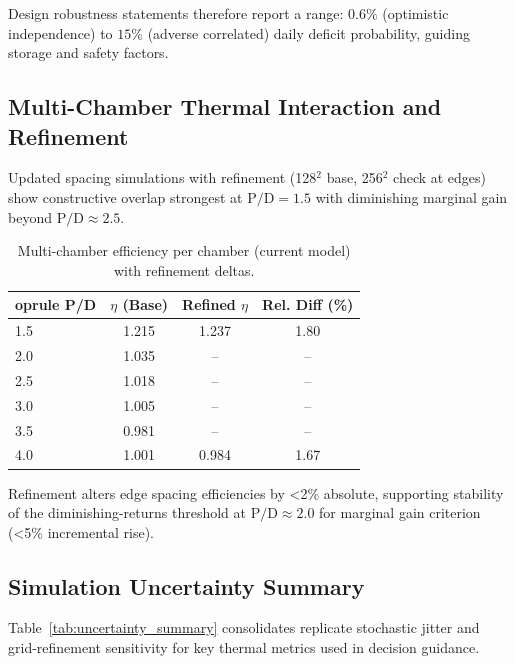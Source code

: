 Design robustness statements therefore report a range: $0.6\%$ (optimistic independence) to $15\%$ (adverse correlated) daily deficit probability, guiding storage and safety factors.

\subsection{Multi-Chamber Thermal Interaction and Refinement}

Updated spacing simulations with refinement (128$^2$ base, 256$^2$ check at edges) show constructive overlap strongest at $\mathrm{P/D}=1.5$ with diminishing marginal gain beyond $\mathrm{P/D}\approx2.5$.

\begin{table}[H]
\centering
\caption{Multi-chamber efficiency per chamber (current model) with refinement deltas.}
\begin{tabular}{@{}lccc@{}}
	oprule
P/D & $\eta$ (Base) & Refined $\eta$ & Rel. Diff (\%) \\
\midrule
1.5 & 1.215 & 1.237 & 1.80 \\
2.0 & 1.035 & -- & -- \\
2.5 & 1.018 & -- & -- \\
3.0 & 1.005 & -- & -- \\
3.5 & 0.981 & -- & -- \\
4.0 & 1.001 & 0.984 & 1.67 \\
\bottomrule
\end{tabular}
\end{table}

Refinement alters edge spacing efficiencies by <2\% absolute, supporting stability of the diminishing-returns threshold at $\mathrm{P/D}\approx2.0$ for marginal gain criterion (<5\% incremental rise).

\subsection{Simulation Uncertainty Summary}

Table~\ref{tab:uncertainty_summary} consolidates replicate stochastic jitter and grid-refinement sensitivity for key thermal metrics used in decision guidance.

